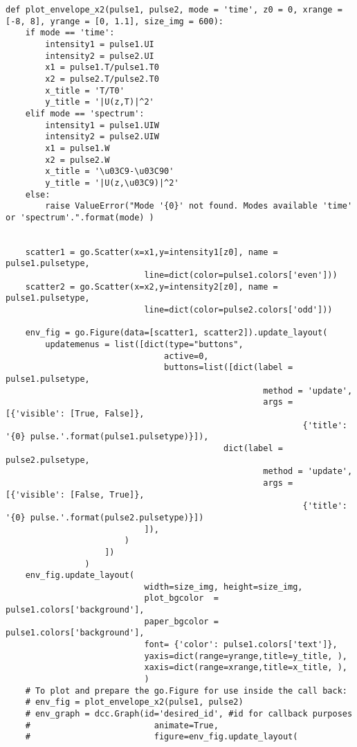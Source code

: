 \begin{verbatim}
def plot_envelope_x2(pulse1, pulse2, mode = 'time', z0 = 0, xrange = [-8, 8], yrange = [0, 1.1], size_img = 600):
    if mode == 'time':
        intensity1 = pulse1.UI
        intensity2 = pulse2.UI
        x1 = pulse1.T/pulse1.T0
        x2 = pulse2.T/pulse2.T0
        x_title = 'T/T0'
        y_title = '|U(z,T)|^2'
    elif mode == 'spectrum':
        intensity1 = pulse1.UIW
        intensity2 = pulse2.UIW
        x1 = pulse1.W
        x2 = pulse2.W
        x_title = '\u03C9-\u03C90'
        y_title = '|U(z,\u03C9)|^2'
    else:
        raise ValueError("Mode '{0}' not found. Modes available 'time' or 'spectrum'.".format(mode) )
    

    scatter1 = go.Scatter(x=x1,y=intensity1[z0], name = pulse1.pulsetype,
                            line=dict(color=pulse1.colors['even']))
    scatter2 = go.Scatter(x=x2,y=intensity2[z0], name = pulse1.pulsetype,
                            line=dict(color=pulse2.colors['odd']))
    
    env_fig = go.Figure(data=[scatter1, scatter2]).update_layout(    
        updatemenus = list([dict(type="buttons",
                                active=0,
                                buttons=list([dict(label = pulse1.pulsetype,
                                                    method = 'update',
                                                    args = [{'visible': [True, False]},
                                                            {'title': '{0} pulse.'.format(pulse1.pulsetype)}]), 
                                            dict(label = pulse2.pulsetype,
                                                    method = 'update',
                                                    args = [{'visible': [False, True]},
                                                            {'title': '{0} pulse.'.format(pulse2.pulsetype)}])
                            ]),
                        )
                    ])
                )
    env_fig.update_layout( 
                            width=size_img, height=size_img,
                            plot_bgcolor  = pulse1.colors['background'],
                            paper_bgcolor = pulse1.colors['background'],
                            font= {'color': pulse1.colors['text']},
                            yaxis=dict(range=yrange,title=y_title, ), 
                            xaxis=dict(range=xrange,title=x_title, ), 
                            )
    # To plot and prepare the go.Figure for use inside the call back:
    # env_fig = plot_envelope_x2(pulse1, pulse2)
    # env_graph = dcc.Graph(id='desired_id', #id for callback purposes
    #                         animate=True,
    #                         figure=env_fig.update_layout(


\end{verbatim}
